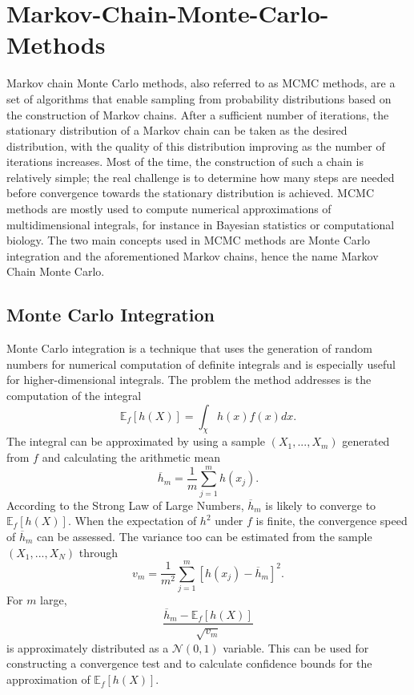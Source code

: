 \documentclass[12pt]{book}
\begin{document}
\section{Markov-Chain-Monte-Carlo-Methods}
Markov chain Monte Carlo methods, also referred to as MCMC methods, are a set of algorithms that enable sampling from probability distributions based on the construction of Markov chains. After a sufficient number of iterations, the stationary distribution of a Markov chain can be taken as the desired distribution, with the quality of this distribution improving as the number of iterations increases. Most of the time, the construction of such a chain is relatively simple; the real challenge is to determine how many steps are needed before convergence towards the stationary distribution is achieved. MCMC methods are mostly used to compute numerical approximations of multidimensional integrals, for instance in Bayesian statistics or computational biology. The two main concepts used in MCMC methods are Monte Carlo integration and the aforementioned Markov chains, hence the name Markov Chain Monte Carlo.
\subsection{Monte Carlo Integration}
Monte Carlo integration is a technique that uses the generation of random numbers for numerical computation of definite integrals and is especially useful for higher-dimensional integrals. The problem the method addresses is the computation of the integral
\begin{equation}
    \mathbb{E}_f\left[h\left(X\right)\right]=\int_\chi h(x)f(x)dx.
\end{equation}
The integral can be approximated by using a sample $\left(X_1,...,X_m\right)$ generated from $f$ and calculating the arithmetic mean
\begin{equation}
    \overline{h}_m=\frac{1}{m}\sum_{j=1}^mh\left(x_j\right).
\end{equation}
According to the Strong Law of Large Numbers, $\overline{h}_m$ is likely to converge to $\mathbb{E}_f\left[h\left(X\right)\right]$. When the expectation of $h^2$ under $f$ is finite, the convergence speed of $\overline{h}_m$ can be assessed. The variance too can be estimated from the sample $\left(X_1,...,X_N\right)$ through
\begin{equation}
    v_m=\frac{1}{m^2}\sum_{j=1}^m\left[h\left(x_j\right)-\overline{h}_m\right]^2.
\end{equation}
For $m$ large,
\begin{equation}
    \frac{\overline{h}_m-\mathbb{E}_f\left[h\left(X\right)\right]}{\sqrt{v_m}}
\end{equation}
is approximately distributed as a $\mathcal{N}(0,1)$ variable. This can be used for constructing a convergence test and to calculate confidence bounds for the approximation of $\mathbb{E}_f\left[h\left(X\right)\right]$.\autocite[Cf.][]{robert2013monte}
\end{document}
